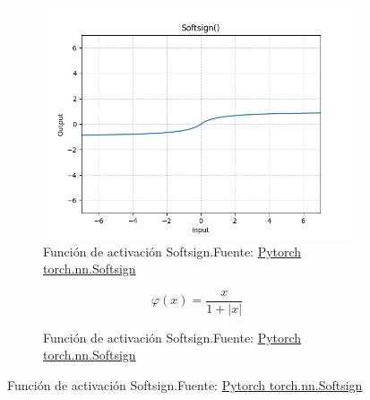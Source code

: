 \begin{figure}[H]
    \centering
    \captionsetup{justification=centering}

    \begin{subfigure}{.475\linewidth}
        \centering
        \includegraphics[width=0.75\linewidth]{figures/equations/Softsign.png}
        \caption{Función de activación Softsign.\newline{}Fuente: \href{https://pytorch.org/docs/stable/generated/torch.nn.Softsign.html}{Pytorch torch.nn.Softsign}}
        \label{subfig:torch.nn.Softsign}
    \end{subfigure}
    \begin{subfigure}{.475\linewidth}
        \centering
        \begin{equation*} \varphi(x) = \frac{x}{1+\lvert x \rvert} \end{equation*}
        \caption{Función de activación Softsign.\newline{}Fuente: \href{https://pytorch.org/docs/stable/generated/torch.nn.Softsign.html}{Pytorch torch.nn.Softsign}}
        \label{subfig:eq-torch.nn.Softsign}
    \end{subfigure}


\end{figure}
